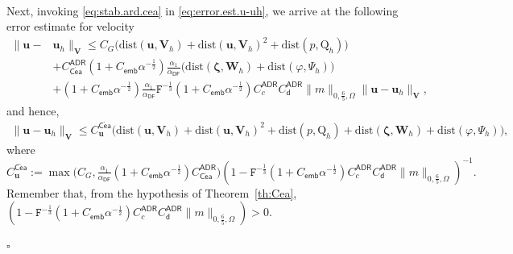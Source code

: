 \documentclass[11pt, reqno, a4paper, twoside]{article}
\newcommand{\bu}{\boldsymbol{u}}
\newcommand\bzeta{\boldsymbol{\zeta}}
\newcommand{\rF}{\mathtt{F}}
\newcommand{\rQ}{\mathrm{Q}}
\newcommand{\bW}{\mathbf{W}}
\newcommand{\bV}{\mathbf{V}}
\newenvironment{proof}{\noindent{\it Proof.}}{\hfill$\square$}
\numberwithin{equation}{section}
\numberwithin{remark}{section}
\numberwithin{figure}{section}
\numberwithin{table}{section}
\begin{document}
{\begin{proof}
\begin{align}
\end{align}
Next, invoking \eqref{eq:stab.ard.cea} in \eqref{eq:error.est.u-uh}, we arrive at the following error estimate for velocity
\begin{align}\label{eq:cea.u}
       \|\bu-&\bu_h\|_{\bV}\leq C_G\bigl(\mathrm{dist}(\bu,\bV_h)+{\mathrm{dist}(\bu,\bV_h)^2}+\mathrm{dist}(p,\rQ_h)\bigr)\nonumber\\&+C_{\mathsf{C\acute{e}a}}^{\mathsf{ADR}}(1+C_{\mathsf{emb}}\alpha^{-\frac12}){\frac{\alpha_1}{\alpha_{\mathsf{DF}}}}\bigl(\mathrm{dist}(\bzeta,\bW_h)+\mathrm{dist}(\varphi,\Psi_h)\bigr)\nonumber\\&+{(1+C_{\mathsf{emb}}\alpha^{-\frac12})}{\frac{\alpha_1}{\alpha_{\mathsf{DF}}}}\rF^{-\frac13}(1+C_{\mathsf{emb}}\alpha^{-\frac12})C_c^{\mathsf{ADR}}C_{\mathsf{d}}^{\mathsf{ADR}}\|m\|_{0,\frac65,\Omega}\|\bu-\bu_h\|_{\bV},  
   \end{align}
   and hence,   \begin{align}\label{eq:final.err.est.for.u}
       \|\bu-\bu_h\|_{\bV}\leq C^{\mathsf{C\acute{e}a}}_{\bu}\bigl(\mathrm{dist}(\bu,\bV_h)+{\mathrm{dist}(\bu,\bV_h)^2}+\mathrm{dist}(p,\rQ_h)+\mathrm{dist}(\bzeta,\bW_h)+\mathrm{dist}(\varphi,\Psi_h)\bigr),
   \end{align}
   where \(C^{\mathsf{C\acute{e}a}}_{\bu}:={\max\bigl(C_G,{\frac{\alpha_1}{\alpha_{\mathsf{DF}}}}{(1+C_{\mathsf{emb}}\alpha^{-\frac12})}C_{\mathsf{C\acute{e}a}}^{\mathsf{ADR}}\bigr)}(1-{\rF^{-\frac13}(1+C_{\mathsf{emb}}\alpha^{-\frac12})C_c^{\mathsf{ADR}}C_{\mathsf{d}}^{\mathsf{ADR}}}\|m\|_{0,\frac65,\Omega})^{-1}.\) Remember that, from the hypothesis of Theorem~\ref{th:Cea},  \((1-{\rF^{-\frac13}(1+C_{\mathsf{emb}}\alpha^{-\frac12})C_c^{\mathsf{ADR}}C_{\mathsf{d}}^{\mathsf{ADR}}}\|m\|_{0,\frac65,\Omega})> 0.\)
   

\end{proof}}
\end{document}
